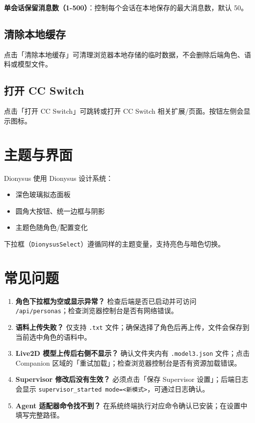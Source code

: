 \documentclass[12pt,a4paper]{article}
\begin{document}
\textbf{单会话保留消息数（1-500）}：控制每个会话在本地保存的最大消息数，默认 50。

\subsection{清除本地缓存}

点击「清除本地缓存」可清理浏览器本地存储的临时数据，不会删除后端角色、语料或模型文件。

\subsection{打开 CC Switch}

点击「打开 CC Switch」可跳转或打开 CC Switch 相关扩展/页面。按钮左侧会显示图标。

\section{主题与界面}

Dionysus 使用 Dionysus 设计系统：

\begin{itemize}
  \item 深色玻璃拟态面板
  \item 圆角大按钮、统一边框与阴影
  \item 主题色随角色/配置变化
\end{itemize}

下拉框（\texttt{DionysusSelect}）遵循同样的主题变量，支持亮色与暗色切换。

\section{常见问题}

\begin{enumerate}
  \item \textbf{角色下拉框为空或显示异常？}  
  检查后端是否已启动并可访问 \texttt{/api/personas}；检查浏览器控制台是否有网络错误。

  \item \textbf{语料上传失败？}  
  仅支持 \texttt{.txt} 文件；确保选择了角色后再上传，文件会保存到当前选中角色的语料中。

  \item \textbf{Live2D 模型上传后右侧不显示？}  
  确认文件夹内有 \texttt{.model3.json} 文件；点击 Companion 区域的「重试加载」；检查浏览器控制台是否有资源加载错误。

  \item \textbf{Supervisor 修改后没有生效？}  
  必须点击「保存 Supervisor 设置」；后端日志会显示 \texttt{supervisor\_started mode=<新模式>}，可通过日志确认。

  \item \textbf{Agent 适配器命令找不到？}  
  在系统终端执行对应命令确认已安装；在设置中填写完整路径。
\end{enumerate}
\end{document}
